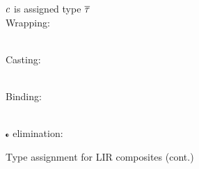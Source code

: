 \documentclass[index.tex]{subfiles}
\begin{document}
\begin{figure} \ContinuedFloat
  \judgbox{\hasTypeCtx{\CtxVar}{\HoleCtxVar}{\SortCompVar}{\SortTypVar}}
    $\SortCompVar$ is assigned type $\SortTypVar$ \\

  Wrapping:
   \\
  Casting:
   \\
  Binding:
  \begin{mathpar}
  \end{mathpar} \\
  $\CII$ elimination:
  \begin{mathpar}
  \end{mathpar}
  \caption{Type assignment for LIR composites (cont.)}
  \label{fig:lir-ta-comp-cont}
\end{figure}
\end{document}
